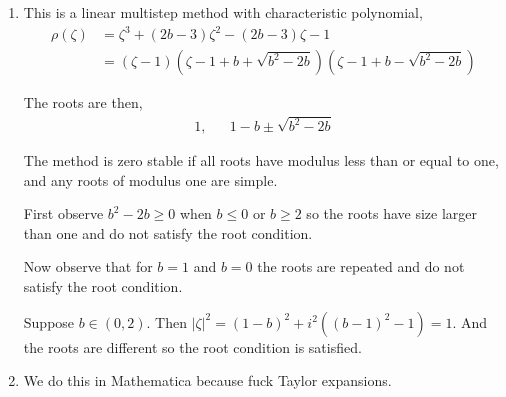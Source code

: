 \documentclass[10pt]{article}
\begin{document}
\begin{solution}[Solution]
\begin{enumerate}[label=(\alph*)]
    \item This is a linear multistep method with characteristic polynomial,
        \begin{align*}
            \rho(\zeta) &= \zeta^3 + (2b-3)\zeta^2 - (2b-3)\zeta - 1 
            \\&= (\zeta - 1)(\zeta - 1 +b + \sqrt{b^2-2b})(\zeta-1+b-\sqrt{b^2-2b})
        \end{align*}

        The roots are then,
        \begin{align*}
            1, && 1-b \pm \sqrt{b^2-2b}
        \end{align*}
        
        The method is zero stable if all roots have modulus less than or equal to one, and any roots of modulus one are simple. 
        
        First observe \( b^2-2b \geq 0 \) when \( b\leq 0 \) or \( b\geq 2 \) so the roots have size larger than one and do not satisfy the root condition.

        Now observe that for \( b=1 \) and \( b=0 \) the roots are repeated and do not satisfy the root condition.

        Suppose \( b\in(0,2) \). Then \( |\zeta|^2 = (1-b)^2 + i^2 ((b-1)^2-1) =1 \). And the roots are different so the root condition is satisfied.

    \item
        We do this in Mathematica because fuck Taylor expansions.


\end{enumerate}
\end{solution}
\end{document}
